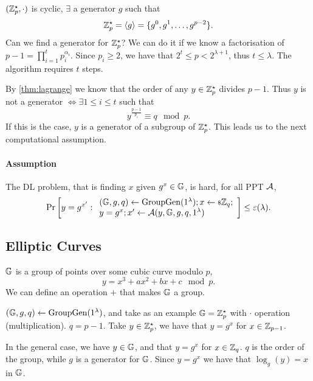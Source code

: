 $(\mathbb{Z}_p^{\star}, \cdot)$ is cyclic, \ie $\exists$ a generator $g$ such that
\begin{equation*}
	\mathbb{Z}_p^{\star} = \left< {g} \right> = \{ g^0, g^1, \dots, g^{p-2} \}.
\end{equation*}
Can we find a generator for $\mathbb{Z}_p^{\star}$?
We can do it if we know a factorisation of $p-1 = \prod_{i=1}^{t} p_i^{\alpha_i}$.
Since $p_i \ge 2$, we have that $2^t \le p < 2^{\lambda+1}$, thus $t \le \lambda$.
The algorithm requires $t$ steps.

By \cref{thm:lagrange} we know that the order of any $y \in \mathbb{Z}_p^{\star}$ divides $p-1$.
Thus $y$ is not a generator $\iff \exists 1 \le i \le t$ such that
\begin{equation*}
	y^{\frac{p-1}{p_i}} \equiv q \mod p.
\end{equation*}
If this is the case, $y$ is a generator of a subgroup of $\mathbb{Z}_p^{\star}$.
This leads us to the next computational assumption.

\paragraph{Assumption}
The \ac{DL} problem, that is finding $x$ given $g^x \in \mathbb{G}$, is hard, \ie for all \ac{PPT} $\mathcal{A}$,
\begin{equation*}
	\mathop{\mathrm{Pr}}\limits_{} \left[ {
		y = g^{x'} :
		\begin{array}{l}
			(\mathbb{G} , \allowbreak g , \allowbreak q) \leftarrow \mathrm{GroupGen}(1^{\lambda}); x \leftarrow {\scriptstyle \$} {\mathbb{Z}_q}; \\
			y = g^x; x' \leftarrow \mathcal{A}(y, \mathbb{G}, g, q, 1^{\lambda})
		\end{array}
	} \right]
	\le \varepsilon(\lambda).
\end{equation*} 

\subsection{Elliptic Curves}

$\mathbb{G}$ is a group of points over some cubic curve modulo $p$, \ie
\begin{equation*}
	y = x^3 + a x^2 + b x + c \mod p.
\end{equation*}
We can define an operation $+$ that makes $\mathbb{G}$ a group.

$(\mathbb{G} , \allowbreak g , \allowbreak q) \leftarrow \mathrm{GroupGen}(1^{\lambda})$, and take as an example $\mathbb{G} = \mathbb{Z}_p^{\star}$ with $\cdot$ operation (multiplication).
$q = p-1$.
Take $y \in \mathbb{Z}_p^{\star}$, we have that $y = g^x$ for $x \in \mathbb{Z}_{p-1}$.

In the general case, we have $y \in \mathbb{G}$, and that $y = g^x$ for $x \in \mathbb{Z}_q$.
$q$ is the order of the group, while $g$ is a generator for $\mathbb{G}$.
Since $y = g^x$ we have that $\log_g(y) = x$ in $\mathbb{G}$.

